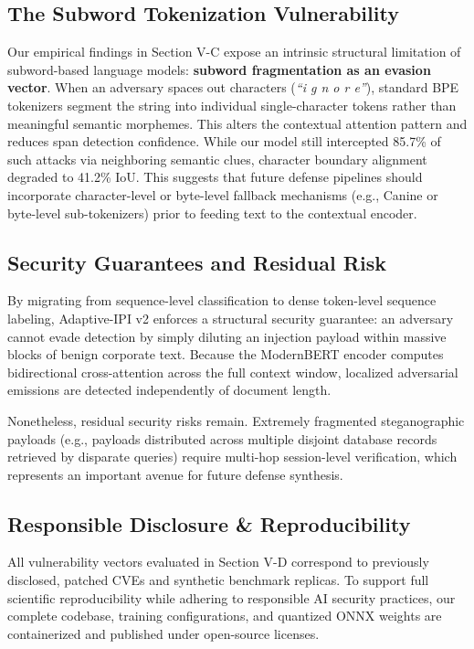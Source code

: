 \documentclass[conference]{IEEEtran}
\begin{document}
\subsection{The Subword Tokenization Vulnerability}

Our empirical findings in Section V-C expose an intrinsic structural limitation of subword-based language models: \textbf{subword fragmentation as an evasion vector}. When an adversary spaces out characters (\textit{``i g n o r e''}), standard BPE tokenizers segment the string into individual single-character tokens rather than meaningful semantic morphemes. This alters the contextual attention pattern and reduces span detection confidence. While our model still intercepted 85.7\% of such attacks via neighboring semantic clues, character boundary alignment degraded to 41.2\% IoU. This suggests that future defense pipelines should incorporate character-level or byte-level fallback mechanisms (e.g., Canine or byte-level sub-tokenizers) prior to feeding text to the contextual encoder.

\subsection{Security Guarantees and Residual Risk}

By migrating from sequence-level classification to dense token-level sequence labeling, Adaptive-IPI v2 enforces a structural security guarantee: an adversary cannot evade detection by simply diluting an injection payload within massive blocks of benign corporate text. Because the ModernBERT encoder computes bidirectional cross-attention across the full context window, localized adversarial emissions are detected independently of document length.

Nonetheless, residual security risks remain. Extremely fragmented steganographic payloads (e.g., payloads distributed across multiple disjoint database records retrieved by disparate queries) require multi-hop session-level verification, which represents an important avenue for future defense synthesis.

\subsection{Responsible Disclosure \& Reproducibility}

All vulnerability vectors evaluated in Section V-D correspond to previously disclosed, patched CVEs and synthetic benchmark replicas. To support full scientific reproducibility while adhering to responsible AI security practices, our complete codebase, training configurations, and quantized ONNX weights are containerized and published under open-source licenses.
\end{document}
